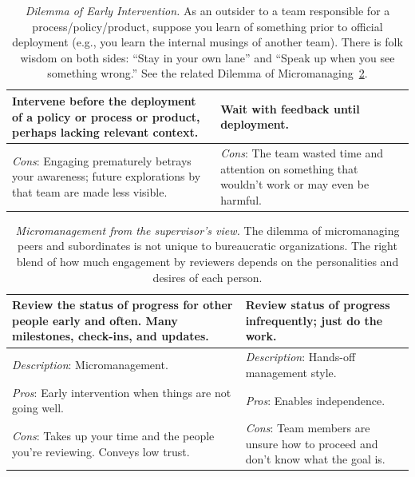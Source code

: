  
\begin{center}
\begin{table}[H] %
\begin{tabular}{ | m{\dilemmatablewidth}| m{\dilemmatablewidth} | } 
  \hline
  \textbf{Intervene before the deployment of a policy or process or product, perhaps lacking relevant context.} &
  \textbf{Wait with feedback until deployment.} \\
  \hline
  \textit{Cons}: Engaging prematurely betrays your awareness; future explorations by that team are made less visible. & 
  \textit{Cons}: The team wasted time and attention on something that wouldn't work or may even be harmful. \\
  \hline
\end{tabular}
\caption{
\textit{Dilemma of Early Intervention.}
As an outsider to a team responsible for a process/policy/product, suppose you learn of something prior to official deployment (e.g., you learn the internal musings of another team). There is folk wisdom on both sides: 
``Stay in your own lane'' 
and 
``Speak up when you see something wrong.''
See the related Dilemma of Micromanaging~\ref{table:micromanaging}.}
\label{table:early-intervention}
\end{table}
\end{center}


\begin{center}
\begin{table}[H] %
\begin{tabular}{ | m{\dilemmatablewidth}| m{\dilemmatablewidth} | } 
  \hline
  \textbf{Review the status of progress for other people early and often. Many milestones, check-ins, and updates.} &
  \textbf{Review status of progress infrequently; just do the work.} \\
  \hline
  \textit{Description}: Micromanagement. & 
  \textit{Description}: Hands-off management style. \\
  \hline
  \textit{Pros}: Early intervention when things are not going well. & 
  \textit{Pros}: Enables independence. \\
  \hline
  \textit{Cons}: Takes up your time and the people you're reviewing. Conveys low trust. & 
  \textit{Cons}: Team members are unsure how to proceed and don't know what the goal is. \\
  \hline
\end{tabular}
\caption{\textit{Micromanagement from the supervisor's view.}
The dilemma of micromanaging peers and subordinates is not unique to bureaucratic organizations. The right blend of how much engagement by reviewers depends on the personalities and desires of each person.}
\label{table:micromanaging}
\end{table}
\end{center}


